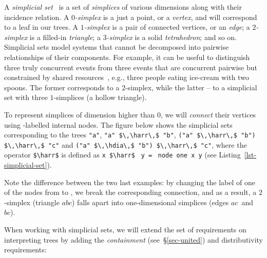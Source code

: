\documentclass[english,submission]{programming}
\newcommand{\code}[1]{\lstinline[mathescape]|#1|}
\newcommand{\hcode}[1]{{\color{darkblue} \lstinline[keywordstyle={}]|#1|}} %
\newcommand{\hdia}{\,\text{\raisebox{-0.2mm}{\Large\color{darkblue} $\diamond$}}\,}
\newcommand{\harr}{\,\text{\color{darkblue} $\rightarrow$}\,}
\newcommand{\zero}{\raisebox{-0.2mm}{\textcircled{\textsf{0}}}\xspace}
\newcommand{\one}{\raisebox{-0.2mm}{\textcircled{\textsf{\hspace{-0.2mm}1}}}\xspace}
\begin{document}
A \emph{simplicial set}~\cite{friedman_simplicial_sets} is a set of
\emph{simplices} of various dimensions along with their incidence relation.
A \emph{$0$-simplex} is a just a point, or a \emph{vertex}, and will correspond
to a leaf in our trees. A \emph{$1$-simplex} is a pair of connected vertices, or
an \emph{edge}; a \emph{$2$-simplex} is a filled-in \emph{triangle}; a
\emph{$3$-simplex} is a solid \emph{tetrahedron}; and so on. Simplicial sets
model systems that cannot be decomposed into pairwise relationships of their
components. For example, it can be useful to distinguish three truly
concurrent events from three events that are concurrent pairwise but constrained
by shared resources~\cite{rosenblum1989look}, e.g., three people eating
ice-cream with two spoons. The former corresponds to a $2$-simplex, while the
latter -- to a simplicial set with three $1$-simplices (a hollow triangle).

To represent simplices of dimension higher than $0$, we will \emph{connect}
their vertices using \one-labelled internal nodes. The figure below shows the
simplicial sets corresponding to the trees
\code{"a"}, \code{"a" $\,\harr\,$ "b"},
\code{("a" $\,\harr\,$ "b") $\,\harr\,$ "c"} and
\code{("a" $\,\hdia\,$ "b") $\,\harr\,$ "c"}, where the operator \code{$\harr$}
is defined as \hcode{x}~\code{$\harr$}~\hcode{y}~\code{=}~\hcode{node one x y}
(see Listing~\ref{lst-simplicial-set}).

\vspace{2.5mm}
\hfill\hspace{-4mm}\hfill
\vspace{2.5mm}

\noindent
Note the difference between the two last examples: by changing the label of one
of the nodes from \one to \zero, we break the corresponding connection,
and as a result, a $2$-simplex (triangle $\textit{abc}$) falls apart into
one-dimensional simplices (edges $\textit{ac}$~and~$\textit{bc}$).

When working with simplicial sets, we will extend the set of requirements on
interpreting trees by adding the \emph{containment} (see~\S\ref{sec-united}) and
distributivity requirements:
\end{document}
